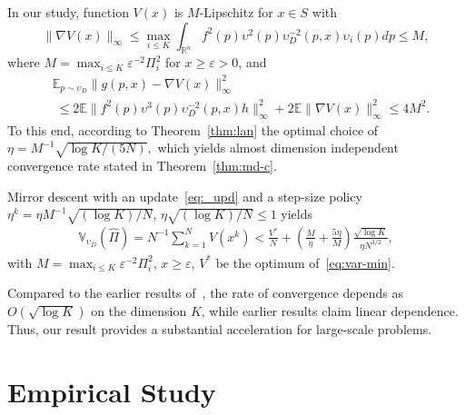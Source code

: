 In our study, function $V(x)$ is $M$-Lipschitz for $x\in S$ with 
$$
\|\nabla V(x)\|_\infty \le \max_{i\le K}\int_{\mathbb{R}^n} f^2(p)\upsilon^2(p)\upsilon^{-2}_D(p,x) \upsilon_i(p) dp \le M, 
$$
where $M = \max_{i\le K}\varepsilon^{-2}\Pi_i^2$ for $x\ge \varepsilon > 0$, and %
\begin{align*}
    & \mathbb{E}_{p\sim \upsilon_D} \|g(p,x) - \nabla V(x)\|_\infty^2 \\
    &\; \le 2\mathbb{E} \|f^2(p)\upsilon^3(p)\upsilon_D^{-2}(p,x) h\|_\infty^2  + 2\mathbb{E} \|\nabla V(x)\|_\infty^2 \le 4 M^2. 
\end{align*}
To this end, according to Theorem~\ref{thm:lan} the optimal choice of 
$\eta = M^{-1}\sqrt{\log K/(5N)},$ which yields almost dimension independent convergence rate stated in Theorem~\ref{thm:md-c}. 
\begin{theorem}\label{thm:md-c} Mirror descent with an update~\eqref{eq:_upd} and a step-size policy $\eta^k \!=\! \eta M^{-1}\!\sqrt{(\log K)/N}$,  $\eta \sqrt{(\log K)/N}\!\le\! 1$ yields
\begin{align*}
    \mathbb{V}_{\upsilon_D} (\hat \Pi) = N^{-1}\sum_{k=1}^N V(x^k) < \frac{V^*}{N} +  \left(\frac{M}{\eta}+ \frac{5\eta}{M}\right)\frac{\sqrt{\log K}}{\eta N^{3/2}}, 
\end{align*}
with $M \!= \!\max_{i\le K}\varepsilon^{-2}\Pi_i^2$,  $x\!\ge\! \varepsilon$, $V^*$ be the optimum of~\eqref{eq:var-min}.
\end{theorem}

Compared to the earlier results of~\cite{owen2019importance}, the rate of convergence depends as $O(\sqrt{\log K})$ on the dimension $K$, while earlier results \cite{owen2019importance} claim linear dependence. Thus, our result provides a substantial acceleration for large-scale problems.  

\section{Empirical Study}\label{sampling:emp}

